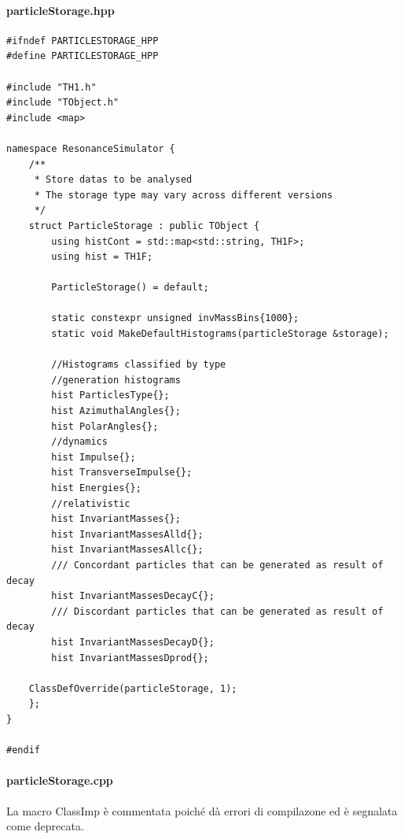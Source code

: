 \documentclass[12pt, a4paper]{article}
\begin{document}
\paragraph{particleStorage.hpp}
\begin{verbatim}
#ifndef PARTICLESTORAGE_HPP
#define PARTICLESTORAGE_HPP

#include "TH1.h"
#include "TObject.h"
#include <map>

namespace ResonanceSimulator {
    /**
     * Store datas to be analysed
     * The storage type may vary across different versions
     */
    struct ParticleStorage : public TObject {
        using histCont = std::map<std::string, TH1F>;
        using hist = TH1F;

        ParticleStorage() = default;

        static constexpr unsigned invMassBins{1000};
        static void MakeDefaultHistograms(particleStorage &storage);

        //Histograms classified by type
        //generation histograms
        hist ParticlesType{};
        hist AzimuthalAngles{};
        hist PolarAngles{};
        //dynamics
        hist Impulse{};
        hist TransverseImpulse{};
        hist Energies{};
        //relativistic
        hist InvariantMasses{};
        hist InvariantMassesAlld{};
        hist InvariantMassesAllc{};
        /// Concordant particles that can be generated as result of decay
        hist InvariantMassesDecayC{};
        /// Discordant particles that can be generated as result of decay 
        hist InvariantMassesDecayD{}; 
        hist InvariantMassesDprod{};

    ClassDefOverride(particleStorage, 1);
    };
}

#endif
\end{verbatim}

\paragraph{particleStorage.cpp}
La macro ClassImp è commentata poiché dà errori di compilazone ed è segnalata come deprecata.
\end{document}
